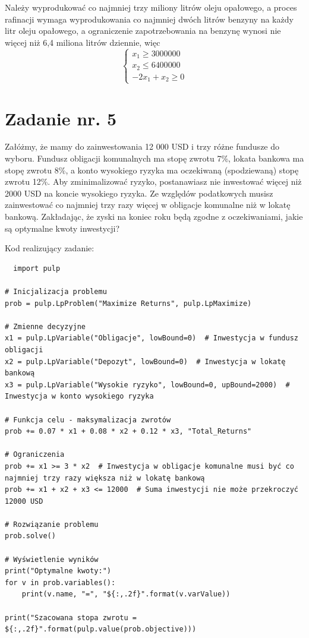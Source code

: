 \documentclass{article}
\begin{document}
Należy wyprodukować co najmniej trzy miliony litrów oleju opałowego, a proces rafinacji wymaga wyprodukowania co najmniej dwóch litrów
benzyny na każdy litr oleju opałowego, a ograniczenie zapotrzebowania na benzynę wynosi nie więcej niż 6,4 miliona litrów dziennie, więc
\begin{equation}
    \begin{cases}
        x_1 \geq 3000000\\
        x_2 \leq 6 400 000\\
        -2x_1 + x_2 \geq 0
    \end{cases}
\end{equation}
\section{Zadanie nr. 5}
Załóżmy, że mamy do zainwestowania 12 000 USD i trzy różne fundusze do 
wyboru. Fundusz obligacji komunalnych ma stopę zwrotu 7\%, lokata bankowa ma stopę zwrotu 
8\%, a konto wysokiego ryzyka ma oczekiwaną (spodziewaną) stopę zwrotu 12\%. Aby 
zminimalizować ryzyko, postanawiasz nie inwestować więcej niż 2000 USD na koncie 
wysokiego ryzyka. Ze względów podatkowych musisz zainwestować co najmniej trzy razy 
więcej w obligacje komunalne niż w lokatę bankową. Zakładając, że zyski na koniec roku będą 
zgodne z oczekiwaniami, jakie są optymalne kwoty inwestycji?

Kod realizujący zadanie:
\begin{lstlisting}
  import pulp

# Inicjalizacja problemu
prob = pulp.LpProblem("Maximize Returns", pulp.LpMaximize)

# Zmienne decyzyjne
x1 = pulp.LpVariable("Obligacje", lowBound=0)  # Inwestycja w fundusz obligacji
x2 = pulp.LpVariable("Depozyt", lowBound=0)  # Inwestycja w lokatę bankową
x3 = pulp.LpVariable("Wysokie ryzyko", lowBound=0, upBound=2000)  # Inwestycja w konto wysokiego ryzyka

# Funkcja celu - maksymalizacja zwrotów
prob += 0.07 * x1 + 0.08 * x2 + 0.12 * x3, "Total_Returns"

# Ograniczenia
prob += x1 >= 3 * x2  # Inwestycja w obligacje komunalne musi być co najmniej trzy razy większa niż w lokatę bankową
prob += x1 + x2 + x3 <= 12000  # Suma inwestycji nie może przekroczyć 12000 USD

# Rozwiązanie problemu
prob.solve()

# Wyświetlenie wyników
print("Optymalne kwoty:")
for v in prob.variables():
    print(v.name, "=", "${:,.2f}".format(v.varValue))

print("Szacowana stopa zwrotu = ${:,.2f}".format(pulp.value(prob.objective)))
\end{lstlisting}
\end{document}
